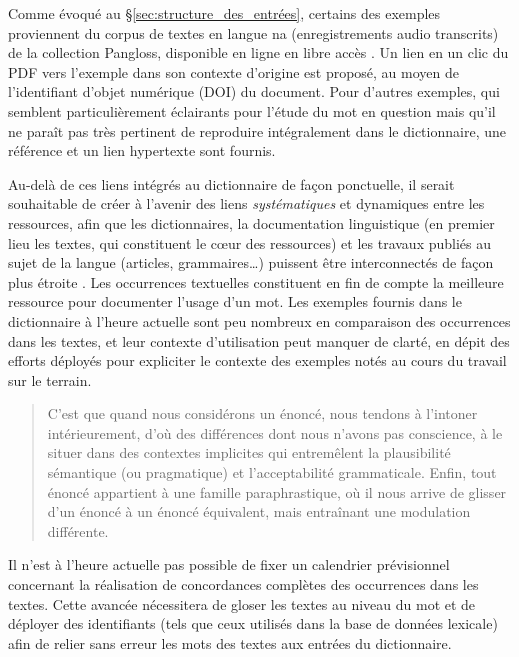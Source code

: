 Comme évoqué au §\ref{sec:structure_des_entrées}, certains des exemples proviennent du corpus de textes en langue na (enregistrements audio transcrits) de la collection Pangloss, disponible en ligne en libre accès \parencite[voir][]{michailovskyetal2014}. Un lien en un clic du PDF vers l'exemple dans son contexte d'origine est proposé, au moyen de l'identifiant d'objet numérique (DOI) du document. Pour d'autres exemples, qui semblent particulièrement éclairants pour l'étude du mot en question mais qu'il ne paraît pas très pertinent de reproduire intégralement dans le dictionnaire, une référence et un lien hypertexte sont fournis.

Au-delà de ces liens intégrés au dictionnaire de façon ponctuelle, il serait souhaitable de créer à l'avenir des liens \emph{systématiques} et dynamiques entre les ressources, afin que les dictionnaires, la documentation linguistique (en premier lieu les textes, qui constituent le cœur des ressources) et les travaux publiés au sujet de la langue (articles, grammaires…) puissent être interconnectés de façon plus étroite \parencite{maxwell2012}. Les occurrences textuelles constituent en fin de compte la meilleure ressource pour documenter l'usage d'un mot. Les exemples fournis dans le dictionnaire à l'heure actuelle sont peu nombreux en comparaison des occurrences dans les textes, et leur contexte d'utilisation peut manquer de clarté, en dépit des efforts déployés pour expliciter le contexte des exemples notés au cours du travail sur le terrain.

\begin{quotation}
    C'est que quand nous considérons un énoncé, nous tendons à l'intoner intérieurement, d'où des différences dont nous n'avons pas conscience, à le situer dans des contextes implicites qui entremêlent la plausibilité sémantique (ou pragmatique) et l'acceptabilité grammaticale. Enfin, tout énoncé appartient à une famille paraphrastique, où il nous arrive de glisser d'un énoncé à un énoncé équivalent, mais entraînant une modulation différente. \parencite[17]{culioli1990}
\end{quotation}

Il n'est à l'heure actuelle pas possible de fixer un calendrier prévisionnel concernant la réalisation de concordances complètes des occurrences dans les textes. Cette avancée nécessitera de gloser les textes au niveau du mot et de déployer des identifiants (tels que ceux utilisés dans la base de données lexicale) afin de relier sans erreur les mots des textes aux entrées du dictionnaire.




